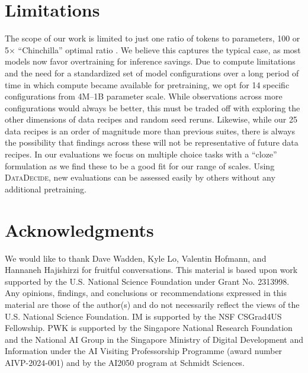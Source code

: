 \documentclass{article}
\theoremstyle{plain}
\theoremstyle{definition}
\theoremstyle{remark}
\newcommand{\numRecipes}{25}
\newcommand{\numScales}{14}
\newcommand{\projSuite}{\textsc{DataDecide}}
\begin{document}
\section{Limitations}
The scope of our work is limited to just one ratio of tokens to parameters, 100 or 5$\times$ ``Chinchilla'' optimal ratio \citep{hoffmann2022trainingcomputeoptimallargelanguage}. We believe this captures the typical case, as most models now favor overtraining for inference savings. 
Due to compute limitations and the need for a standardized set of model configurations over a long period of time in which compute became available for pretraining, we opt for \numScales{} specific configurations from 4M--1B parameter scale. While observations across more configurations would always be better, this must be traded off with exploring the other dimensions of data recipes and random seed reruns. Likewise, while our \numRecipes{} data recipes is an order of magnitude more than previous suites, there is always the possibility that findings across these will not be representative of future data recipes.
In our evaluations we focus on multiple choice tasks with a ``cloze'' formulation as we find these to be a good fit for our range of scales. Using \projSuite{}, new evaluations can be assessed easily by others without any additional pretraining.

\section*{Acknowledgments}
We would like to thank Dave Wadden, Kyle Lo, Valentin Hofmann, and Hannaneh Hajishirzi for fruitful conversations. This material is based upon work supported by the U.S. National Science Foundation under Grant No. 2313998. Any opinions, findings, and conclusions or recommendations expressed in this material are those of the author(s) and do not necessarily reflect the views of the U.S. National Science Foundation. IM is supported by the NSF CSGrad4US Fellowship. PWK is supported by the Singapore National Research Foundation and the National AI Group in the Singapore Ministry of Digital Development and Information under the AI Visiting Professorship Programme (award number AIVP-2024-001) and by the AI2050 program at Schmidt Sciences.
\end{document}
